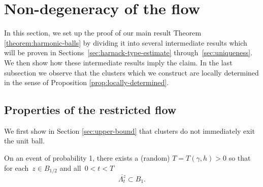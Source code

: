\documentclass[12pt]{amsart}
\numberwithin{equation}{section}
\newcommand{\cluster}[2]{\hyperref[eq:non-co-set]{\mathit{\Lambda}^{#1}_{#2}}}
\begin{document}
	
	
	
	
	
	
	
	
	
	
	
	
	
	
	\section{Non-degeneracy of the flow} \label{sec:non-degenerate}
	
	
	In this section, we set up the proof of our main result Theorem \ref{theorem:harmonic-balls}
	by dividing it into several intermediate results which will be proven in Sections~\ref{sec:harnack-type-estimate} through~\ref{sec:uniqueness}. We then show how these intermediate results imply the claim. 
	In the last subsection we observe that the clusters which we construct are locally determined in the sense of Proposition \ref{prop:locally-determined}. 
	
	\subsection{Properties of the restricted flow}
	
	We first show in Section \ref{sec:upper-bound} that clusters do not immediately exit the unit ball.
	\begin{prop} \label{prop:upper-bound}
		On an event of probability 1, there exists a (random) $T = T(\gamma, h) > 0$ so that for each~$z \in B_{1/2}$ 
		and all~$0 < t < T$
		\begin{equation}
		\overline{{{\cluster{z}{t}}}} \subset B_1.
		\end{equation}
	\end{prop}
	
\end{document}
